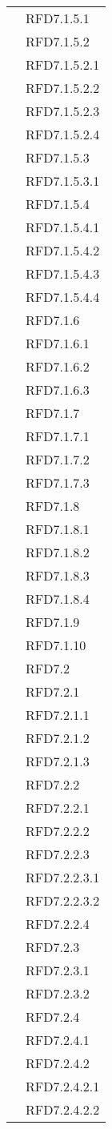 \begin{longtable}{|>{\centering}m{10cm}|m{3cm}<{\centering}|}
& RFD7.1.5.1\\
& RFD7.1.5.2\\
& RFD7.1.5.2.1\\
& RFD7.1.5.2.2\\
& RFD7.1.5.2.3\\
& RFD7.1.5.2.4\\
& RFD7.1.5.3\\
& RFD7.1.5.3.1\\
& RFD7.1.5.4\\
& RFD7.1.5.4.1\\
& RFD7.1.5.4.2\\
& RFD7.1.5.4.3\\
& RFD7.1.5.4.4\\
& RFD7.1.6\\
& RFD7.1.6.1\\
& RFD7.1.6.2\\
& RFD7.1.6.3\\
& RFD7.1.7\\
& RFD7.1.7.1\\
& RFD7.1.7.2\\
& RFD7.1.7.3\\
& RFD7.1.8\\
& RFD7.1.8.1\\
& RFD7.1.8.2\\
& RFD7.1.8.3\\
& RFD7.1.8.4\\
& RFD7.1.9\\
& RFD7.1.10\\
& RFD7.2\\
& RFD7.2.1\\
& RFD7.2.1.1\\
& RFD7.2.1.2\\
& RFD7.2.1.3\\
& RFD7.2.2\\
& RFD7.2.2.1\\
& RFD7.2.2.2\\
& RFD7.2.2.3\\
& RFD7.2.2.3.1\\
& RFD7.2.2.3.2\\
& RFD7.2.2.4\\
& RFD7.2.3\\
& RFD7.2.3.1\\
& RFD7.2.3.2\\
& RFD7.2.4\\
& RFD7.2.4.1\\
& RFD7.2.4.2\\
& RFD7.2.4.2.1\\
& RFD7.2.4.2.2\\

\end{longtable}

